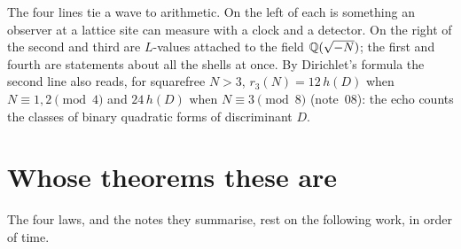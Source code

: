 \documentclass[11pt]{article}
\begin{document}
\physical
The four lines tie a wave to arithmetic.
On the left of each is something an observer at a lattice site can measure with a clock and a detector.
On the right of the second and third are $L$-values attached to the field $\mathbb{Q}(\sqrt{-N})$; the first and fourth are statements about all the shells at once.
By Dirichlet's formula the second line also reads, for squarefree $N>3$, $r_3(N) = 12\,h(D)$ when $N\equiv1,2\pmod4$ and $24\,h(D)$ when $N\equiv3\pmod8$ (note~08): the echo counts the classes of binary quadratic forms of discriminant $D$.

\section{Whose theorems these are}

The four laws, and the notes they summarise, rest on the following work, in order of time.
\end{document}
